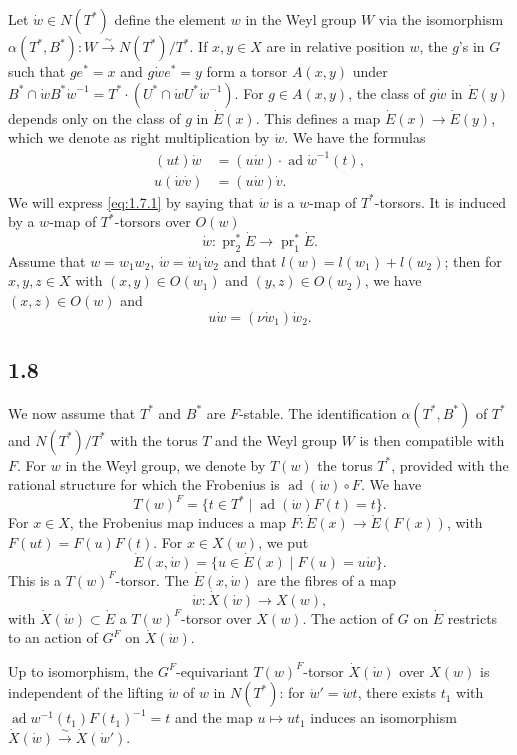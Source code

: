 \documentclass[11pt]{amsart}
\theoremstyle{plain}
\theoremstyle{remark}
\DeclareMathOperator{\pr}{pr}
\DeclareMathOperator{\ad}{ad}
\begin{document}
Let $\dot{w} \in N(T^*)$ define the element $w$ in the Weyl group $W$ via the isomorphism $\alpha(T^*, B^*): W \xrightarrow{\sim} N(T^*)/T^*$. If $x, y \in X$ are in relative position $w$, the $g$'s in $G$ such that $ge^* = x$ and $g\dot{w}e^* = y$ form a torsor $A(x, y)$ under $B^* \cap \dot{w}B^*\dot{w}^{-1} = T^* \cdot (U^* \cap \dot{w}U^*\dot{w}^{-1})$. For $g \in A(x, y)$, the class of $g\dot{w}$ in $\dot{E}(y)$ depends only on the class of $g$ in $\dot{E}(x)$. This defines a map $\dot{E}(x) \to \dot{E}(y)$, which we denote as right multiplication by $\dot{w}$. We have the formulas
\begin{align}
\label{eq:1.7.1} (ut)\dot{w} &= (u\dot{w}) \cdot \ad\dot{w}^{-1}(t), \\
\label{eq:1.7.2} u(\dot{w}\dot{v}) &= (u\dot{w})\dot{v}.
\end{align}
We will express \eqref{eq:1.7.1} by saying that $\dot{w}$ is a $w$-map of $T^*$-torsors. It is induced by a $w$-map of $T^*$-torsors over $O(w)$
\[
\dot{w}: \pr_2^* \dot{E} \longrightarrow \pr_1^* \dot{E}.
\]
Assume that $w = w_1 w_2$, $\dot{w} = \dot{w}_1\dot{w}_2$ and that $l(w) = l(w_1) + l(w_2)$; then for $x, y, z \in X$ with $(x, y) \in O(w_1)$ and $(y, z) \in O(w_2)$, we have $(x, z) \in O(w)$ and
\begin{equation}\label{eq:1.7.3}
u \dot{w} = (\nu \dot{w}_1)\dot{w}_2.
\end{equation}

\subsection{1.8} We now assume that $T^*$ and $B^*$ are $F$-stable. The identification $\alpha(T^*, B^*)$ of $T^*$ and $N(T^*)/T^*$ with the torus $T$ and the Weyl group $W$ is then compatible with $F$. For $w$ in the Weyl group, we denote by $T(w)$ the torus $T^*$, provided with the rational structure for which the Frobenius is $\ad(\dot{w}) \circ F$. We have
\[
T(w)^F = \{t \in T^* \mid \ad(\dot{w})F(t) = t\}.
\]
For $x \in X$, the Frobenius map induces a map $F: \dot{E}(x) \to \dot{E}(F(x))$, with $F(ut) = F(u)F(t)$. For $x \in X(w)$, we put
\[
\dot{E}(x, \dot{w}) = \{u \in \dot{E}(x) \mid F(u) = u\dot{w}\}.
\]
This is a $T(w)^F$-torsor. The $\dot{E}(x, \dot{w})$ are the fibres of a map
\[
\dot{w}: \dot{X}(\dot{w}) \longrightarrow X(w),
\]
with $\dot{X}(\dot{w}) \subset \dot{E}$ a $T(w)^F$-torsor over $X(w)$. The action of $G$ on $\dot{E}$ restricts to an action of $G^F$ on $\dot{X}(\dot{w})$.

Up to isomorphism, the $G^F$-equivariant $T(w)^F$-torsor $\dot{X}(\dot{w})$ over $X(w)$ is independent of the lifting $\dot{w}$ of $w$ in $N(T^*)$: for $\dot{w}' = \dot{w}t$, there exists $t_1$ with $\ad w^{-1}(t_1)F(t_1)^{-1} = t$ and the map $u \mapsto ut_1$ induces an isomorphism $\dot{X}(\dot{w}) \xrightarrow{\sim} \dot{X}(\dot{w}')$.
\end{document}
